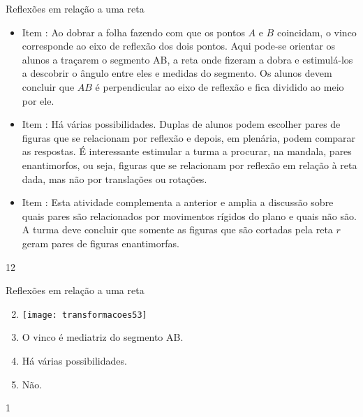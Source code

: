 \begin{sugestions}{Reflexões em relação a uma reta}
{
\begin{itemize}[wide]
\item Item : Ao dobrar a folha fazendo com que os pontos $A$ e $B$ coincidam, o vinco corresponde ao eixo de reflexão dos dois pontos. Aqui pode-se orientar os alunos a traçarem o segmento AB, a reta onde fizeram a dobra e estimulá-los a descobrir o ângulo entre eles e medidas do segmento. Os alunos devem concluir que $AB$ é perpendicular ao eixo de reflexão e fica dividido ao meio por ele.  

\item Item : Há várias possibilidades. Duplas de alunos podem escolher pares de figuras que se relacionam por reflexão e depois, em plenária, podem comparar as respostas. É interessante estimular a turma a procurar, na mandala, pares enantimorfos, ou seja, figuras que se relacionam por reflexão em relação à reta dada, mas não por translações ou rotações.

\item Item : Esta atividade complementa a anterior e amplia a discussão sobre quais pares são relacionados por movimentos rígidos do plano e quais não são. A turma deve concluir que somente as figuras que são cortadas pela reta $r$ geram pares de figuras enantimorfas.  
\end{itemize}
}{1}{2}
\end{sugestions}
\begin{answer}{Reflexões em relação a uma reta}
{
\begin{enumerate}\setcounter{enumi}{1}
\item {}
{
\texttt{[image: transformacoes53]}
}

\item O vinco é mediatriz do segmento AB.
\item Há várias possibilidades. 
\item Não.

\end{enumerate}
}{1}
\end{answer}
\clearmargin
